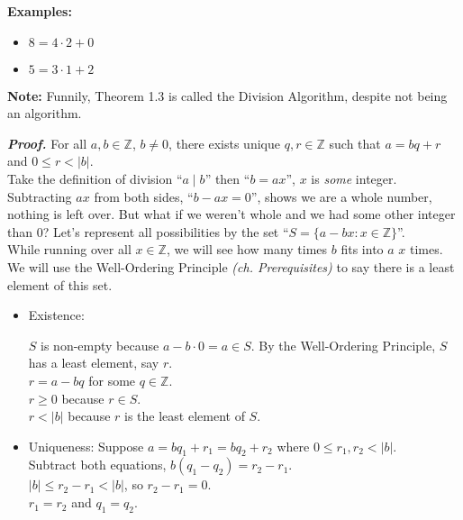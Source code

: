 \noindent
\textbf{Examples:}
\begin{itemize}
    \item $8=4\cdot2+0$
    \item $5=3\cdot1+2$
\end{itemize}

\begin{Note}
    \textbf{Note:} Funnily, Theorem 1.3 is called the Division Algorithm, despite not being an algorithm.
\end{Note}

\newpage

\begin{Proof} 
    \textit{\textbf{Proof.}} For all $a,b\in\mathbb{Z}$, $b\neq0$, there exists unique $q,r\in\mathbb{Z}$ such that $a=bq+r$ and $0\leq r<|b|$.\\

    \noindent
    Take the definition of division ``$a\mid b$'' then ``$b=ax$'', $x$ is
    \textit{some} integer. Subtracting $ax$ from both sides, ``$b-ax=0$'', shows we are a whole number, nothing is left over.
    But what if we weren't whole and we had some other integer than 0? Let's represent all possibilities by the set
    ``$S=\{a-bx:x\in\mathbb{Z}\}$''.\\

    \noindent
    While running over all $x\in\mathbb{Z}$, we will see how many times $b$ fits into $a$ $x$ times.\\

    We will use the Well-Ordering Principle \textit{(ch. Prerequisites)} to say
    there is a least element of this set.\\
    \begin{itemize}
        \item Existence:

              $S$ is non-empty because $a-b\cdot0=a\in S$. By the Well-Ordering Principle, $S$ has a least element, say $r$.\\
              $r=a-bq$ for some $q\in\mathbb{Z}$.\\
              $r\geq0$ because $r\in S$.\\
              $r<|b|$ because $r$ is the least element of $S$.
        \item Uniqueness: Suppose $a=bq_1+r_1=bq_2+r_2$ where $0\leq r_1,r_2<|b|$.\\
              Subtract both equations, $b(q_1-q_2)=r_2-r_1$.\\
              $|b|\leq r_2-r_1<|b|$, so $r_2-r_1=0$.\\
              $r_1=r_2$ and $q_1=q_2$.
    \end{itemize}
\end{Proof}


